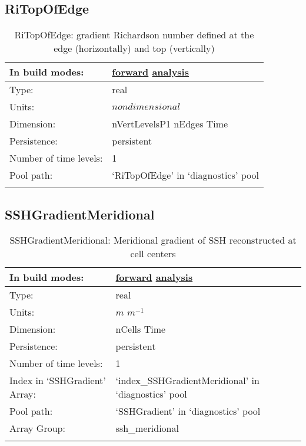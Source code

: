 \subsection[RiTopOfEdge]{RiTopOfEdge}
\label{subsec:var_sec_diagnostics_RiTopOfEdge}
\begin{center}
\begin{longtable}{| p{2.0in} | p{4.0in} |}
        \hline 
        In build modes: & \hyperref[subsec:forward_var_tab_diagnostics]{forward} \hyperref[subsec:analysis_var_tab_diagnostics]{analysis} \\
        \hline 
        Type: & real \\
        \hline 
        Units: & $nondimensional$ \\
        \hline 
        Dimension: & nVertLevelsP1 nEdges Time \\
        \hline 
        Persistence: & persistent \\
        \hline 
        Number of time levels: & 1 \\
        \hline 
            Pool path: & `RiTopOfEdge' in `diagnostics' pool \\
		 \hline 
    \caption{RiTopOfEdge: gradient Richardson number defined at the edge (horizontally) and top (vertically)}
\end{longtable}
\end{center}
\subsection[SSHGradientMeridional]{SSHGradientMeridional}
\label{subsec:var_sec_diagnostics_SSHGradientMeridional}
\begin{center}
\begin{longtable}{| p{2.0in} | p{4.0in} |}
        \hline 
        In build modes: & \hyperref[subsec:forward_var_tab_diagnostics]{forward} \hyperref[subsec:analysis_var_tab_diagnostics]{analysis} \\
        \hline 
        Type: & real \\
        \hline 
        Units: & $m$ $m^{-1}$ \\
        \hline 
        Dimension: & nCells Time \\
        \hline 
        Persistence: & persistent \\
        \hline 
        Number of time levels: & 1 \\
        \hline 
		 Index in `SSHGradient' Array: & `index\_SSHGradientMeridional' in `diagnostics' pool \\
		 \hline 
            Pool path: & `SSHGradient' in `diagnostics' pool \\
		 \hline 
		 Array Group: & ssh\_meridional \\
		 \hline 
    \caption{SSHGradientMeridional: Meridional gradient of SSH reconstructed at cell centers}
\end{longtable}
\end{center}

